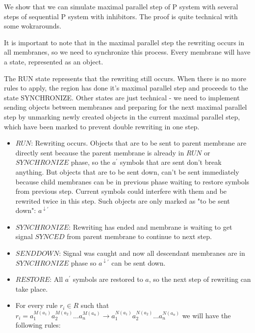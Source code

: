 \documentclass[a4paper,10pt]{article}
\begin{document}
\begin{dokaz}
  We show that we can simulate maximal parallel step of P system with several steps of sequential P system with inhibitors. The proof is quite technical with some wokrarounds.


  It is important to note that in the maximal parallel step the rewriting occurs in all membranes, so we need to synchronize this process. Every membrane will have a state, represented as an object.

  The RUN state represents that the rewriting still occurs. When there is no more rules to apply, the region has done it's maximal parallel step and proceeds to the state SYNCHRONIZE. Other states are just technical - we need to implement sending objects between membranes and preparing for the next maximal parallel step by unmarking newly created objects in the current maximal parallel step, which have been marked to prevent double rewriting in one step.

  \begin{itemize}
    \item $RUN$: Rewriting occurs. Objects that are to be sent to parent membrane are directly sent because the parent membrane is already in $RUN$ or $SYNCHRONIZE$ phase, so the $a^{\prime}$ symbols that are sent don't break anything. But objects that are to be sent down, can't be sent immediately because child membranes can be in previous phase waiting to restore symbols from previous step. Current symbols could interfere with them and be rewrited twice in this step. Such objects are only marked as "to be sent down": $a^{\downarrow\prime}$

    \item $SYNCHRONIZE$: Rewriting has ended and membrane is waiting to get signal $SYNCED$ from parent membrane to continue to next step.

    \item $SENDDOWN$: Signal was caught and now all descendant membranes are in $SYNCHRONIZE$ phase so $a^{\downarrow\prime}$ can be sent down.

    \item $RESTORE$: All $a^{\prime}$ symbols are restored to $a$, so the next step of rewriting can take place.
  \end{itemize}


  \begin{itemize}
    \item For every rule $r_i\in R$ such that $r_i = a_1^{M(a_1)}a_2^{M(a_2)}\dots a_n^{M(a_n)} \rightarrow a_1^{N(a_1)}a_2^{N(a_2)}\dots a_n^{N(a_n)}$ we will have the following rules:
  

\end{itemize}
\end{dokaz}
\end{document}
